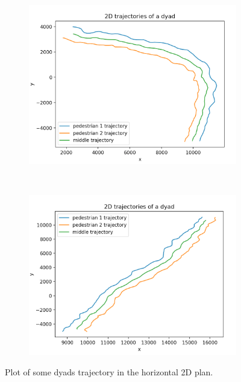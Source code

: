 \documentclass[12pt,a4paper,twoside]{article}
\begin{document}
\begin{figure}
    \centering
    \begin{subfigure}[b]{0.45\textwidth}
        \includegraphics[width=\textwidth]{images/traj1}
    \end{subfigure}
    ~
    \begin{subfigure}[b]{0.45\textwidth}
        \includegraphics[width=\textwidth]{images/traj2}
    \end{subfigure}
    \caption{Plot of some dyads trajectory in the horizontal 2D plan.}
    \label{fig:trajectories}
\end{figure}
\end{document}
